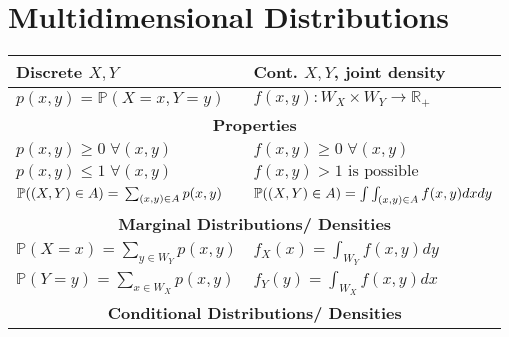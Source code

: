 \section{Multidimensional Distributions}
\renewcommand{\arraystretch}{1.3}
\setlength{\oldtabcolsep}{\tabcolsep}\setlength\tabcolsep{2pt}
{\small %
    \begin{tabularx}{\linewidth}{p{.5\linewidth} p{.5\linewidth}}
        \textbf{Discrete} $X, Y$                                                          & \textbf{Cont}. $X, Y$, \textbf{joint density}                            \\
        \toprule
        $p(x,y)=\mathbb{P}(X=x,Y=y)$                                                      & $f(x,y)\colon W_X\times W_Y\to\mathbb{R_+}$                              \\
        \multicolumn{2}{c}{\textbf{Properties}}                                                                                                                      \\
        $p(x,y)\ge0\;\forall(x,y)$                                                        & $f(x,y)\geq0\;\forall(x,y)$                                              \\
        $p(x,y)\le1\;\forall(x,y)$                                                        & $f(x,y)>1\text{ is possible}$                                            \\
        $\mathbb{P}((X,Y)\in A)=\newline\sum_{(x,y)\in A}p(x,y)$                          & $\mathbb{P}((X,Y)\in A)\newline=\int\int_{(x,y)\in A}f(x,y)dxdy$         \\
        \multicolumn{2}{c}{\textbf{Marginal Distributions/ Densities}}                                                                                               \\
        $\mathbb P(X=x)=\sum_{y\in W_Y}p(x,y)$                                            & $f_X(x)=\int_{W_Y}f(x,y)dy$                                              \\
        $\mathbb P(Y=y)=\sum_{x\in W_X}p(x,y)$                                            & $f_Y(y)=\int_{W_X}f(x,y)dx$                                              \\
        \multicolumn{2}{c}{\textbf{Conditional Distributions/ Densities}}                                                                                            \\

\end{tabularx}}
